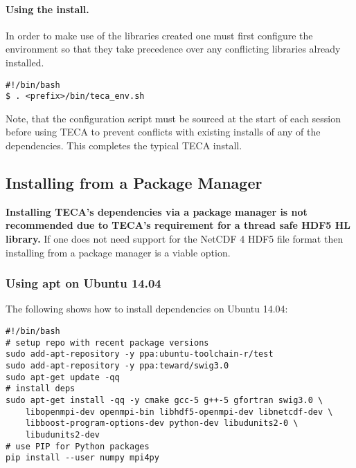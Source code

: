 \documentclass[a4paper,10pt,DIV=12]{scrreprt}
\begin{document}
\paragraph{Using the install.}
\noindent In order to make use of the libraries created one
must first configure the environment so that they take precedence over any
conflicting libraries already installed.

\vspace{2mm}\hspace{0.2in}\begin{minipage}{0.8\textwidth}
\begin{verbatim}
#!/bin/bash
$ . <prefix>/bin/teca_env.sh
\end{verbatim}
\end{minipage}\vspace{2mm}

\noindent Note, that the configuration script must be sourced at the start of
each session before using TECA to prevent conflicts with existing installs of
any of the dependencies. This completes the typical TECA install.

\subsection{Installing from a Package Manager}
\textbf{ \color{red} Installing TECA's dependencies via a package manager is not
recommended due to TECA's requirement for a thread safe HDF5 HL library.} If one
does not need support for the NetCDF 4 HDF5 file format then installing from a
package manager is a viable option.

\subsubsection{Using apt on Ubuntu 14.04}
The following shows how to install dependencies on Ubuntu 14.04:

\vspace{2mm}\hspace{0.2in}\begin{minipage}{0.8\textwidth}
\begin{verbatim}
#!/bin/bash
# setup repo with recent package versions
sudo add-apt-repository -y ppa:ubuntu-toolchain-r/test
sudo add-apt-repository -y ppa:teward/swig3.0
sudo apt-get update -qq
# install deps
sudo apt-get install -qq -y cmake gcc-5 g++-5 gfortran swig3.0 \
    libopenmpi-dev openmpi-bin libhdf5-openmpi-dev libnetcdf-dev \
    libboost-program-options-dev python-dev libudunits2-0 \
    libudunits2-dev
# use PIP for Python packages
pip install --user numpy mpi4py
\end{verbatim}
\end{minipage}\vspace{2mm}
\end{document}
